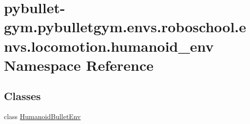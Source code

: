 \hypertarget{namespacepybullet-gym_1_1pybulletgym_1_1envs_1_1roboschool_1_1envs_1_1locomotion_1_1humanoid__env}{}\section{pybullet-\/gym.pybulletgym.\+envs.\+roboschool.\+envs.\+locomotion.\+humanoid\+\_\+env Namespace Reference}
\label{namespacepybullet-gym_1_1pybulletgym_1_1envs_1_1roboschool_1_1envs_1_1locomotion_1_1humanoid__env}
\subsection*{Classes}
\begin{DoxyCompactItemize}
\item 
class \hyperlink{classpybullet-gym_1_1pybulletgym_1_1envs_1_1roboschool_1_1envs_1_1locomotion_1_1humanoid__env_1_1_humanoid_bullet_env}{Humanoid\+Bullet\+Env}
\end{DoxyCompactItemize}
